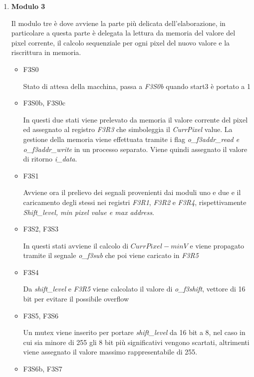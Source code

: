 \documentclass{article}
\begin{document}
\begin{enumerate}
    \item\textbf{Modulo 3} 
		
		Il modulo tre è dove avviene la parte più delicata dell'elaborazione, in particolare a questa parte è delegata la lettura da memoria del valore del pixel corrente, il calcolo sequenziale per ogni pixel del nuovo valore e la riscrittura in memoria.
		
		\begin{itemize}
		
		\item F3S0
		
		Stato di attesa della macchina, passa a \emph{F3S0b} quando start3 è portato a 1
		
		\item F3S0b, F3S0c
		
		In questi due stati viene prelevato da memoria il valore corrente del pixel ed assegnato al registro \emph{F3R3} che simboleggia il \emph{CurrPixel} value. La gestione della memoria viene effettuata tramite i flag \emph{o\_f3addr\_read \emph{e} o\_f3addr\_write} in un processo separato. Viene quindi assegnato il valore di ritorno \emph{i\_data}.
		
		\item F3S1
		
		Avviene ora il prelievo dei segnali provenienti dai moduli uno e due e il caricamento degli stessi nei registri \emph{F3R1}, \emph{F3R2} e \emph{F3R4}, rispettivamente \textit{Shift\_level, min pixel value \emph{e} max address}.
		
		\item F3S2, F3S3
		
		In questi stati avviene il calcolo di \(CurrPixel - minV\) e viene propagato tramite il segnale \emph{o\_f3sub} che poi viene caricato in \emph{F3R5}
		
		\item F3S4
		
		Da \emph{shift\_level} e \emph{F3R5} viene calcolato il valore di \emph{o\_f3shift}, vettore di 16 bit per evitare il possibile overflow
		
		\item F3S5, F3S6
		
		Un mutex viene inserito per portare \emph{shift\_level} da 16 bit a 8, nel caso in cui sia minore di 255 gli 8 bit più significativi vengono scartati, altrimenti viene assegnato il valore massimo rappresentabile di 255.
		
		\item F3S6b, F3S7
		

\end{itemize}
\end{enumerate}
\end{document}
